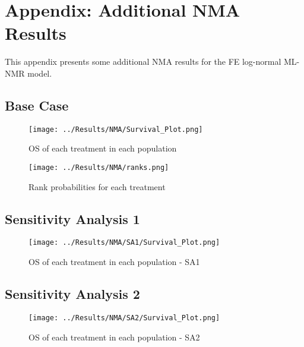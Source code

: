 \chapter{Appendix: Additional NMA Results}\label{NMAAppendix}

This appendix presents some additional NMA results for the FE log-normal ML-NMR model. 

\section{Base Case}

\begin{figure}[h]
    \centering
    \texttt{[image: ../Results/NMA/Survival\_Plot.png]}
    \caption{OS of each treatment in each population}
    \label{fig:pred_survbc}
\end{figure}

\begin{figure}[h]
    \centering
    \texttt{[image: ../Results/NMA/ranks.png]}
    \caption{Rank probabilities for each treatment}
    \label{fig:rankplot}
\end{figure}

\clearpage
\section{Sensitivity Analysis 1}

\begin{figure}[h]
    \centering
    \texttt{[image: ../Results/NMA/SA1/Survival\_Plot.png]}
    \caption{OS of each treatment in each population - SA1}
    \label{fig:pred_survSA1}
\end{figure}

\clearpage
\section{Sensitivity Analysis 2}

\begin{figure}[h]
    \centering
    \texttt{[image: ../Results/NMA/SA2/Survival\_Plot.png]}
    \caption{OS of each treatment in each population - SA2}
    \label{fig:pred_survSA2}
\end{figure}
